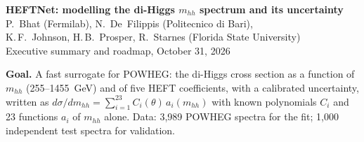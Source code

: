 
\pagestyle{plain}

\begin{center}
{\large\bfseries HEFTNet: modelling the di-Higgs $m_{hh}$ spectrum and its uncertainty}\\[2pt]
{\small P.~Bhat (Fermilab), N.~De~Filippis (Politecnico di Bari),\\
K.\,F.~Johnson, H.\,B.~Prosper, R.~Starnes (Florida State University)}\\[2pt]
{\small Executive summary and roadmap, October 31, 2026}
\end{center}
\vspace{-4pt}
\small
\noindent\textbf{Goal.} A fast surrogate for POWHEG: the di-Higgs cross section as a function of
$m_{hh}$ (255--1455~GeV) and of five HEFT coefficients, with a calibrated uncertainty, written as
$d\sigma/dm_{hh} = \sum_{i=1}^{23} C_i(\theta)\,a_i(m_{hh})$ with known polynomials $C_i$ and 23
functions $a_i$ of $m_{hh}$ alone. Data: 3,989 POWHEG spectra for the fit; 1,000 independent test
spectra for validation.

